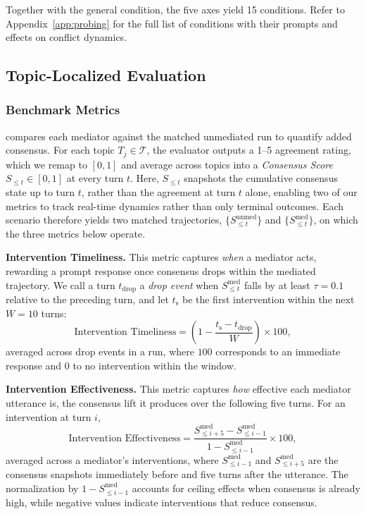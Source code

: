 Together with the general condition, the five axes yield 15 conditions. Refer to Appendix~\ref{app:probing} for the full list of conditions with their prompts and effects on conflict dynamics.

\subsection{Topic-Localized Evaluation}
\label{sec:method:evaluation}

\subsubsection{Benchmark Metrics}
\label{sec:method:evaluation:metrics}

\algname{} compares each mediator against the matched unmediated run to quantify added consensus. For each topic $T_j \in \mathcal{T}$, the evaluator outputs a 1--5 agreement rating, which we remap to $[0,1]$ and average across topics into a \emph{Consensus Score} $S_{\leq t} \in [0,1]$ at every turn $t$. Here, $S_{\leq t}$ snapshots the cumulative consensus state up to turn $t$, rather than the agreement at turn $t$ alone, enabling two of our metrics to track real-time dynamics rather than only terminal outcomes. Each scenario therefore yields two matched trajectories, $\{S^\mathrm{unmed}_{\leq t}\}$ and $\{S^\mathrm{med}_{\leq t}\}$, on which the three metrics below operate.

\smallskip\smallskip\noindent\textbf{{Intervention Timeliness.}}
This metric captures \emph{when} a mediator acts, rewarding a prompt response once consensus drops within the mediated trajectory. We call a turn $t_\mathrm{drop}$ a \emph{drop event} when $S^\mathrm{med}_{\leq t}$ falls by at least $\tau = 0.1$ relative to the preceding turn, and let $t_\mathrm{s}$ be the first intervention within the next $W = 10$ turns:
\[
\text{Intervention Timeliness} =
\left(1 - \frac{t_\mathrm{s} - t_\mathrm{drop}}{W}\right) \times 100,
\]
averaged across drop events in a run, where $100$ corresponds to an immediate response and $0$ to no intervention within the window.

\smallskip\smallskip\noindent\textbf{{Intervention Effectiveness.}}
This metric captures \emph{how} effective each mediator utterance is, the consensus lift it produces over the following five turns. For an intervention at turn $i$,
\[\text{Intervention Effectiveness} = \frac{S^\mathrm{med}_{\leq i+5} - S^\mathrm{med}_{\leq i-1}}{1 - S^\mathrm{med}_{\leq i-1}} \times 100,\]
averaged across a mediator's interventions, where $S^\mathrm{med}_{\leq i-1}$ and $S^\mathrm{med}_{\leq i+5}$ are the consensus snapshots immediately before and five turns after the utterance. The normalization by $1 - S^\mathrm{med}_{\leq i-1}$ accounts for ceiling effects when consensus is already high, while negative values indicate interventions that reduce consensus.


